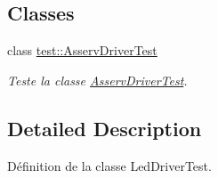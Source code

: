 \subsection*{Classes}
\begin{DoxyCompactItemize}
\item 
class \hyperlink{classtest_1_1AsservDriverTest}{test\+::\+Asserv\+Driver\+Test}
\begin{DoxyCompactList}\small\item\em Teste la classe \hyperlink{classtest_1_1AsservDriverTest}{Asserv\+Driver\+Test}. \end{DoxyCompactList}\end{DoxyCompactItemize}


\subsection{Detailed Description}
Définition de la classe Led\+Driver\+Test. 

